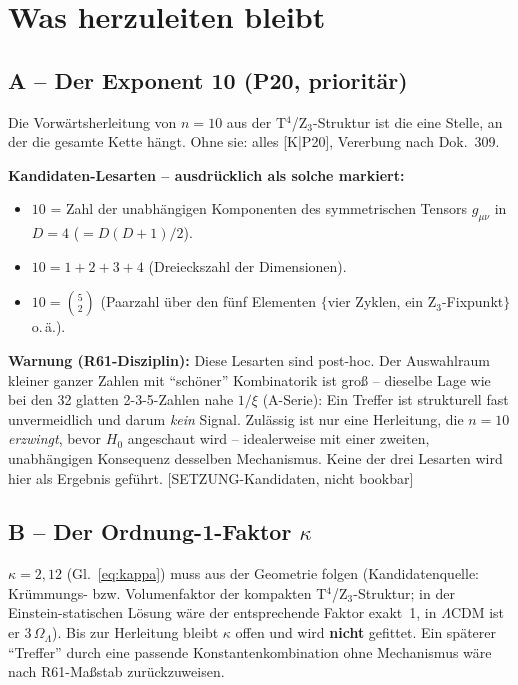 \chapter{Was herzuleiten bleibt}
\label{ch:pflichten}

\section{A -- Der Exponent 10 (P20, prioritär)}

Die Vorwärtsherleitung von $n=10$ aus der T$^4$/Z$_3$-Struktur ist
die eine Stelle, an der die gesamte Kette hängt. Ohne sie: alles
[K|P20], Vererbung nach Dok.~309.

\textbf{Kandidaten-Lesarten -- ausdrücklich als solche markiert:}
\begin{itemize}
  \item $10$ = Zahl der unabhängigen Komponenten des symmetrischen
        Tensors $g_{\mu\nu}$ in $D=4$ ($= D(D{+}1)/2$).
  \item $10 = 1+2+3+4$ (Dreieckszahl der Dimensionen).
  \item $10 = \binom{5}{2}$ (Paarzahl über den fünf Elementen
        $\{$vier Zyklen, ein Z$_3$-Fixpunkt$\}$ o.\,ä.).
\end{itemize}

\textbf{Warnung (R61-Disziplin):} Diese Lesarten sind post-hoc.
Der Auswahlraum kleiner ganzer Zahlen mit \enquote{schöner}
Kombinatorik ist groß -- dieselbe Lage wie bei den 32 glatten
2-3-5-Zahlen nahe $1/\xi$ (A-Serie): Ein Treffer ist strukturell
fast unvermeidlich und darum \emph{kein} Signal. Zulässig ist nur
eine Herleitung, die $n=10$ \emph{erzwingt}, bevor $H_0$ angeschaut
wird -- idealerweise mit einer zweiten, unabhängigen Konsequenz
desselben Mechanismus. Keine der drei Lesarten wird hier als
Ergebnis geführt. [SETZUNG-Kandidaten, nicht bookbar]

\section{B -- Der Ordnung-1-Faktor $\kappa$}

$\kappa = 2{,}12$ (Gl.~\eqref{eq:kappa}) muss aus der Geometrie
folgen (Kandidatenquelle: Krümmungs- bzw. Volumenfaktor der
kompakten T$^4$/Z$_3$-Struktur; in der Einstein-statischen Lösung
wäre der entsprechende Faktor exakt~1, in $\Lambda$CDM ist er
$3\,\Omega_\Lambda$). Bis zur Herleitung bleibt $\kappa$ offen und
wird \textbf{nicht} gefittet. Ein späterer \enquote{Treffer} durch
eine passende Konstantenkombination ohne Mechanismus wäre nach
R61-Maßstab zurückzuweisen.

